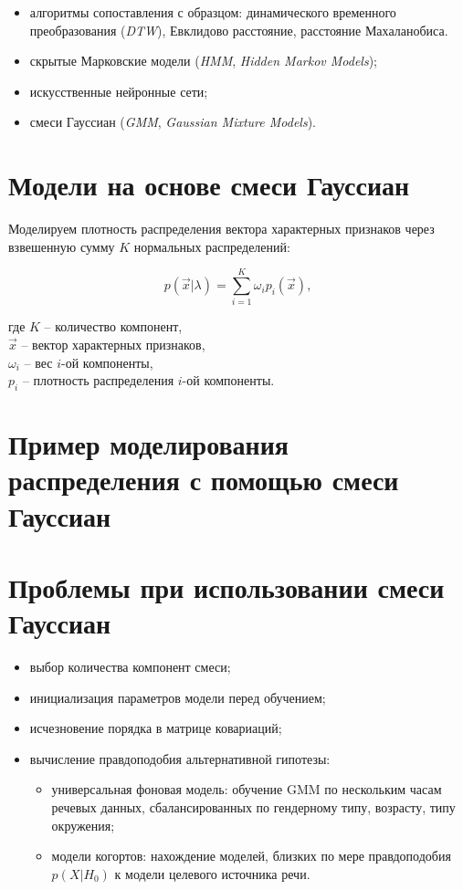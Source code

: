 \documentclass[12pt]{article}
\begin{document}
\begin{itemize}
\item алгоритмы сопоставления с образцом: динамического временного преобразования (\emph{DTW}), Евклидово расстояние, расстояние Махаланобиса.
\item скрытые Марковские модели (\emph{HMM}, \emph{Hidden Markov Models});
\item искусственные нейронные сети;
\item смеси Гауссиан (\emph{GMM}, \emph{Gaussian Mixture Models}).
\end{itemize}

\section{Модели на основе смеси Гауссиан}

Моделируем плотность распределения вектора характерных признаков через взвешенную сумму $K$ нормальных распределений:

\begin{equation}
p(\vec x | \lambda) = \sum_{i=1}^K{\omega_i p_i(\vec x)},
\end{equation}

\noindent где $K$ -- количество компонент,\\
$\vec x$ -- вектор характерных признаков,\\
$\omega_i$ -- вес $i$-ой компоненты, \\
$p_i$ -- плотность распределения $i$-ой компоненты.

\section{Пример моделирования распределения с помощью смеси Гауссиан}

\begin{figure}[h!]
\end{figure}

\section{Проблемы при использовании смеси Гауссиан}

\begin{itemize}
\item выбор количества компонент смеси;
\item инициализация параметров модели перед обучением;
\item исчезновение порядка в матрице ковариаций;
\item вычисление правдоподобия альтернативной гипотезы:
    \begin{itemize}
        \item универсальная фоновая модель: обучение GMM по нескольким часам речевых данных, сбалансированных по гендерному типу, возрасту, типу окружения;
        \item модели когортов: нахождение моделей, близких по мере правдоподобия $p(X|H_0)$ к модели целевого источника речи.
    \end{itemize}
\end{itemize}
\end{document}

